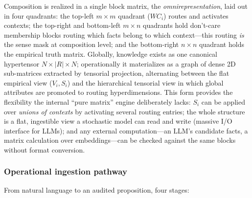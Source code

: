 \documentclass{article}
\begin{document}
Composition is realized in a single block matrix, the
\emph{omnirepresentation}, laid out in four quadrants: the top-left
\(m \times m\) quadrant (\(WC_i\)) routes and activates contexts; the
top-right and bottom-left \(m \times n\) quadrants hold don't-care
membership blocks routing which facts belong to which context---this
routing \emph{is} the sense mask at composition level; and the
bottom-right \(n \times n\) quadrant holds the empirical truth matrix.
Globally, knowledge exists as one canonical hypertensor
\(N \times |R| \times N\); operationally it materializes as a graph of
dense 2D sub-matrices extracted by tensorial projection, alternating
between the flat empirical view (\(V_i, S_i\)) and the hierarchical
tensorial view in which global attributes are promoted to routing
hyperdimensions. This form provides the flexibility the internal ``pure
matrix'' engine deliberately lacks: \(S_i\) can be applied over
\emph{unions of contexts} by activating several routing entries; the
whole structure is a flat, ingestible view a stochastic model can read
and write (massive I/O interface for LLMs); and any external
computation---an LLM's candidate facts, a matrix calculation over
embeddings---can be checked against the same blocks without format
conversion.

\hypertarget{operational-ingestion-pathway}{%
\subsubsection{\texorpdfstring{Operational ingestion pathway
\label{app:ingestion}}{Operational ingestion pathway }}\label{operational-ingestion-pathway}}

From natural language to an audited proposition, four stages:
\end{document}
